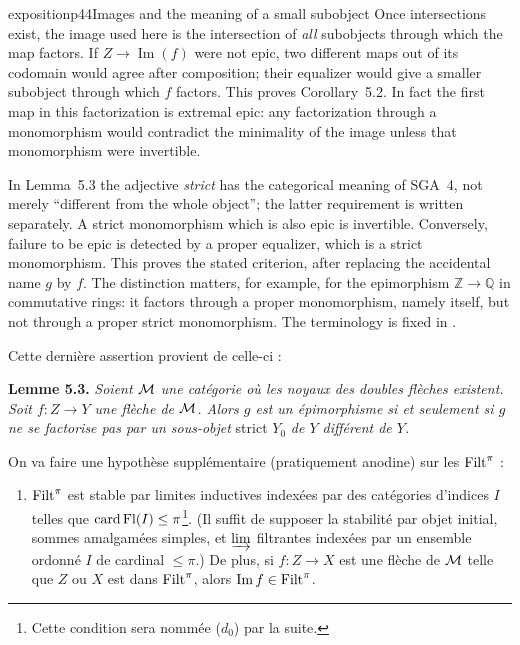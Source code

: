\begin{dcomment}{exposition}{p44}{Images and the meaning of a small subobject}
Once intersections exist, the image used here is the intersection of \emph{all} subobjects through which the map factors. If $Z\to\operatorname{Im}(f)$ were not epic, two different maps out of its codomain would agree after composition; their equalizer would give a smaller subobject through which $f$ factors. This proves Corollary~5.2. In fact the first map in this factorization is extremal epic: any factorization through a monomorphism would contradict the minimality of the image unless that monomorphism were invertible.

In Lemma~5.3 the adjective \emph{strict} has the categorical meaning of SGA~4, not merely ``different from the whole object''; the latter requirement is written separately. A strict monomorphism which is also epic is invertible. Conversely, failure to be epic is detected by a proper equalizer, which is a strict monomorphism. This proves the stated criterion, after replacing the accidental name $g$ by $f$. The distinction matters, for example, for the epimorphism $\mathbb Z\to\mathbb Q$ in commutative rings: it factors through a proper monomorphism, namely itself, but not through a proper strict monomorphism. The terminology is fixed in \citep[Expos\'e~I, 10.2--10.5]{SGA4I1972}.
\end{dcomment}


Cette dernière assertion provient de celle-ci :

\textbf{Lemme 5.3.} \textit{Soient $\mathcal{M}$ une catégorie où les noyaux des doubles flèches existent. Soit $f : Z \longrightarrow Y$ une flèche de $\mathcal{M}$. Alors $g$ est un épimorphisme si et seulement si $g$ ne se factorise pas par un sous-objet} strict $Y_0$ \textit{de $Y$ différent de $Y$.} %

On va faire une hypothèse supplémentaire (pratiquement anodine) sur les $\mathrm{Filt}^{\pi}$ :

\begin{enumerate}[nosep]
\item[\textit{d})] $\mathrm{Filt}^{\pi}$ est stable par limites inductives indexées par des catégories d'indices $I$ telles que $\operatorname{card} \mathrm{Fl}(I) \leq \pi$\footnote[16]{Cette condition sera nommée ($d_0$) par la suite.}. (Il suffit de supposer la stabilité par objet initial, sommes amalgamées simples, et $\varinjlim$ filtrantes indexées par un ensemble ordonné $I$ de cardinal $\leq \pi$.) De plus, si $f : Z \longrightarrow X$ est une flèche de $\mathcal{M}$ telle que $Z$ ou $X$ est dans $\mathrm{Filt}^{\pi}$, alors $\mathrm{Im}\, f \in \mathrm{Filt}^{\pi}$.
\end{enumerate}

